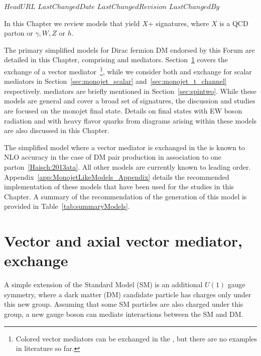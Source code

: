 \svnidlong
{$HeadURL$}
{$LastChangedDate$}
{$LastChangedRevision$}
{$LastChangedBy$}



In this Chapter we review 
models that yield $X$+\MET{} signatures,
where $X$ is a QCD parton or $\gamma, W, Z$ or $h$.

The primary simplified models  for Dirac fermion DM endorsed by this Forum are detailed in this Chapter, 
comprising \spinzero and \spinone mediators. Section~\ref{sec:monojet_V} covers the
\schannel exchange of a vector mediator~\footnote{Colored vector mediators 
can be exchanged in the \tchannel, but there are no examples in literature so far.}, 
while we consider both \schannel and \tchannel exchange for scalar mediators in
Section~\ref{sec:monojet_scalar} and~\ref{sec:monojet_t_channel} respectively. 
\Spintwo mediators are briefly mentioned in Section~\ref{sec:spintwo}.
While these models are general and cover a broad set of signatures,
the discussion and studies are focused on the monojet final state. 
Details on final states with EW boson radiation and with heavy flavor quarks 
from diagrams arising within these models are also discussed in this Chapter.

The simplified model where a vector mediator is exchanged in the \schannel 
is known to NLO accuracy in the case of DM pair production in association to one parton~\ref{Haisch:2013ata}. 
All other models are currently known to leading order. Appendix~\ref{app:MonojetLikeModels_Appendix}
details the recommended implementation of these models that
have been used for the studies in this Chapter. A summary of the recommendation of the generation of this model
is provided in Table~\ref{tab:summaryModels}.


\section{Vector and axial vector mediator, \schannel exchange}
\label{sec:monojet_V}

A simple extension of the Standard Model (SM) is an
additional $U(1)$ gauge symmetry, where a dark matter (DM)
candidate particle has charges only under this new group.
Assuming that some SM particles are also charged under
this group, a new gauge boson can mediate interactions
between the SM and DM.   

